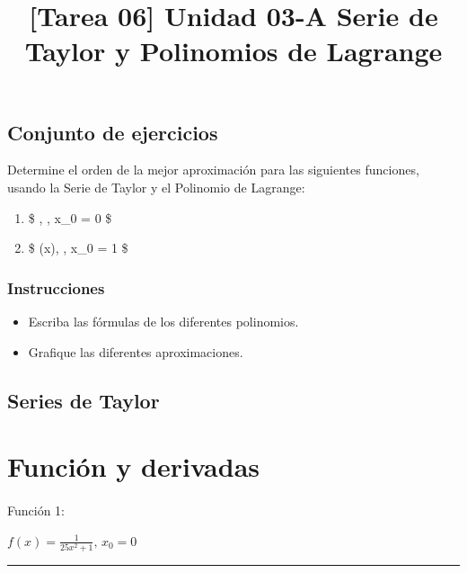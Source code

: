 \documentclass[
  letterpaper,
  DIV=11,
  numbers=noendperiod]{scrartcl}
\title{{[}Tarea 06{]} Unidad 03-A \textbar{} Serie de Taylor y
Polinomios de Lagrange}
\author{}
\date{}
\makeatletter
\let\oldparagraph\paragraph
\renewcommand{\paragraph}{
    \@ifstar
      \xxxParagraphStar
      \xxxParagraphNoStar
  }
\newcommand{\xxxParagraphStar}[1]{\oldparagraph*{#1}\mbox{}}
\newcommand{\xxxParagraphNoStar}[1]{\oldparagraph{#1}\mbox{}}
\providecommand{\tightlist}{%
  \setlength{\itemsep}{0pt}\setlength{\parskip}{0pt}}\usepackage{longtable,booktabs,array}
\makeatother
\begin{document}
\maketitle


\subsection{Conjunto de ejercicios}\label{conjunto-de-ejercicios}

Determine el orden de la mejor aproximación para las siguientes
funciones, usando la Serie de Taylor y el Polinomio de Lagrange:

\begin{enumerate}
\def\labelenumi{\arabic{enumi}.}
\tightlist
\item
  \$ , , x\_0 = 0 \$
\item
  \$ \arctan(x), , x\_0 = 1 \$
\end{enumerate}

\subsubsection{Instrucciones}\label{instrucciones}

\begin{itemize}
\tightlist
\item
  Escriba las fórmulas de los diferentes polinomios.
\item
  Grafique las diferentes aproximaciones.
\end{itemize}

\subsection{Series de Taylor}\label{series-de-taylor}

\section{Función y derivadas}\label{funciuxf3n-y-derivadas}

\paragraph{Función 1:}\label{funciuxf3n-1}

\(f(x) = \frac{1}{25x^2 + 1}, \, x_0 = 0\)

\begin{center}\rule{0.5\linewidth}{0.5pt}\end{center}
\end{document}

